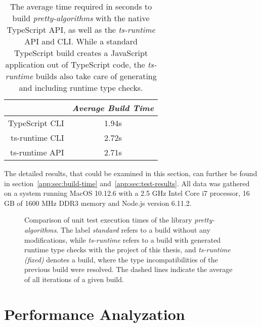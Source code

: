 \begin{table}
\caption{The average time required in seconds to build \emph{pretty-algorithms} with the native TypeScript API, as well as the \emph{ts-runtime} API and CLI. While a standard TypeScript build creates a JavaScript application out of TypeScript code, the \emph{ts-runtime} builds also take care of generating and including runtime type checks.}
\label{tab:build-time}
\centering
\setlength{\tabcolsep}{5mm}
\def\arraystretch{1.25}
\small
\begin{tabular}{|r||c|}
    \hline
    & \emph{Average Build Time} \\
    \hline
    \hline
    TypeScript CLI & 1.94s \\
    \hline
    ts-runtime CLI & 2.72s \\
    \hline
    ts-runtime API & 2.71s \\
    \hline
  \end{tabular}
\end{table}
The detailed results, that could be examined in this section, can further be found in section~\ref{app:sec:build-time} and~\ref{app:sec:test-results}. All data was gathered on a system running MacOS 10.12.6 with a 2.5 GHz Intel Core i7 processor, 16 GB of 1600 MHz DDR3 memory and Node.js version 6.11.2.
\begin{figure}
\centering

\caption{Comparison of unit test execution times of the library \emph{pretty-algorithms}. The label \emph{standard} refers to a build without any modifications, while \emph{ts-runtime} refers to a build with generated runtime type checks with the project of this thesis, and \emph{ts-runtime (fixed)} denotes a build, where the type incompatibilities of the previous build were resolved. The dashed lines indicate the average of all iterations of a given build.}
\label{fig:operational-test}
\end{figure}

\section{Performance Analyzation}
\label{sec:performance-analyzation}

